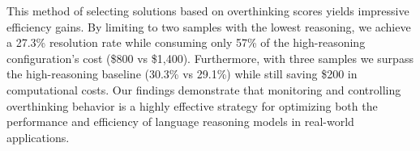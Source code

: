 This method of selecting solutions based on overthinking scores yields impressive efficiency gains. By limiting to two samples with the lowest reasoning, we achieve a 27.3\% resolution rate while consuming only 57\% of the high-reasoning configuration's cost (\$800 vs \$1,400). Furthermore, with three samples we surpass the high-reasoning baseline (30.3\% vs 29.1\%) while still saving \$200 in computational costs. Our findings demonstrate that monitoring and controlling overthinking behavior is a highly effective strategy for optimizing both the performance and efficiency of language reasoning models in real-world applications.

